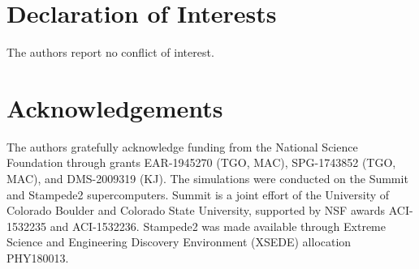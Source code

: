 \section*{Declaration of Interests}
The authors report no conflict of interest.


\section*{Acknowledgements}

The authors gratefully acknowledge funding from the National Science Foundation through grants EAR-1945270 (TGO, MAC), SPG-1743852 (TGO, MAC), and DMS-2009319 (KJ). The simulations were conducted on the Summit and Stampede2 supercomputers. Summit is a joint effort of the University of Colorado Boulder and Colorado State University, supported by NSF awards ACI-1532235 and ACI-1532236. Stampede2 was made available through Extreme Science and Engineering Discovery Environment (XSEDE) allocation PHY180013. %

